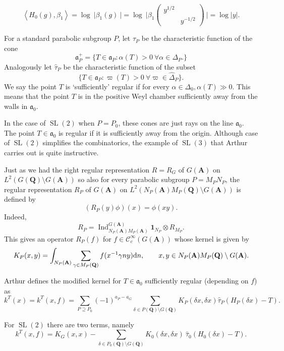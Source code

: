 \documentclass[11pt]{amsart}
\def\apg{a_{P} - a_{G}}
\def\A{\mathbf A}
\def\Q{\mathbf Q}
\def\CCC{\mathcal C}
\def\aaa{\mathfrak a}
\def\cb#1{{\color{black}#1}}
\def\d{\text d}
\def\bs{\setminus} 			%
\def\Ind{\operatorname{Ind}}
\def\Ltwo{L^2}
\def\mod#1{\lvert #1 \rvert} %
\def\sl{\operatorname{SL}}
\def\sprod#1#2{\left\langle #1 , #2 \right\rangle}  %
\theoremstyle{remark}
\begin{document}
\cb{
	\[ \sprod{H_0(g)}{\beta_1} = \log \ \mod{\beta_1(g)\ } = \log \ \mod{\beta_1 
			\begin{pmatrix} y^{1/2} & \\ & y^{-1/2} \end{pmatrix} \ } = \log \mod{y}. \]
}

For a standard parabolic subgroup $P$, let $\tau_P$ be the characteristic function of the cone 
\[ \aaa_P^+ = \{ T \in \aaa_P : \alpha(T) > 0 \ \forall \alpha \in \Delta_P. \} \]
Analogously let $\hat\tau_P$ be the characteristic function of the subset
\[ \{ T \in \aaa_P : \varpi(T) > 0 \ \forall \varpi \in \hat\Delta_P \}. \]
We say the point $T$ is `sufficiently' regular if for every $\alpha \in \Delta_0, \alpha(T) \gg 0$. This means that the point $T$ is in the positive Weyl chamber sufficiently away from the walls in $\aaa_0$. 

\cb{ In the case of $\sl(2)$ when $P = P_0$, these cones are just rays on the line $\aaa_0$. The point $T \in \aaa_0$ is regular if it is sufficiently away from the origin.} Although case of $\sl(2)$ simplifies the combinatorics, the example of $\sl(3)$ that Arthur carries out is quite instructive. 

Just as we had the right regular representation $R = R_G$ of $G(\A)$ on $\Ltwo(G(\Q) \bs G(\A))$ so also for every parabolic subgroup $P = M_P N_P$, the regular representation $R_P$ of $G(\A)$ on $\Ltwo(N_P(\A) M_P(\Q) \bs G(\A))$ is defined by 
\[ (R_P(y)\phi)(x) = \phi(xy). \]
Indeed, 
\[ R_P = \Ind_{N_P(\A)M_P(\A)}^{G(\A)} \mathbf 1_{N_P} \otimes R_{M_P}. \]
This gives an operator $R_P(f)$ for $f \in \CCC_c^\infty(G(\A))$ whose kernel is given by
\[ K_P(x, y) = \int_{N_P(\A)} \sum_{\gamma \in M_P(\Q)} f(x^{-1} \gamma n y) \d n, \qquad 
		x, y \in N_P(\A)M_P(\Q)\bs G(\A). \]

Arthur defines the modified kernel for $T \in \aaa_0$ sufficiently regular (depending on $f$) as
\begin{equation} \label{kernel}
	k^T(x) = k^T(x, f) = \sum_{P \supseteq P_0} (-1)^{\apg} \sum_{\delta \in P(\Q) \bs G(\Q)}
		K_P(\delta x, \delta x) \hat\tau_P(H_P(\delta x) - T). 
\end{equation}

\cb{For $\sl(2)$ there are two terms, namely}
\cb{\begin{equation} \label{k_sl2}
	k^T(x, f) = K_G(x, x) - \sum_{\delta \in P_0(\Q) \bs G(\Q)} K_0(\delta x, \delta x) \ \hat\tau_0(H_0(\delta x) - T).
\end{equation} }
\end{document}

